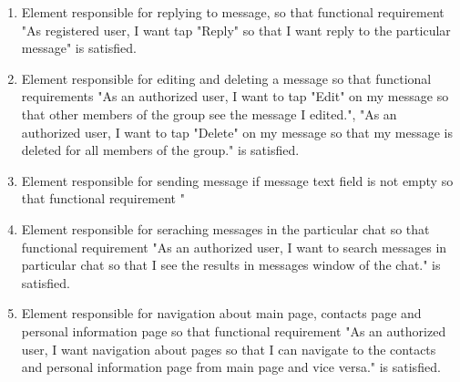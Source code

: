 \begin{enumerate}
    \item Element responsible for replying to message, so that functional requirement "As registered user,
    I want tap "Reply" so that I want reply to the particular message" is satisfied.
    \item Element responsible for editing and deleting a message so that functional requirements "As an authorized user, I want to tap
    "Edit" on my message so that other members of the group see the message I edited.", "As an authorized user, I want to tap "Delete"
    on my message so that my message is deleted for all members of the group." is satisfied.
    \item Element responsible for sending message if message text field is not empty so that functional requirement "
    \item Element responsible for seraching messages in the particular chat so that functional requirement "As an authorized user, I want to search messages
    in particular chat so that I see the results in messages window of the chat." is satisfied.
    \item Element responsible for navigation about main page, contacts page and personal information page so that functional requirement
    "As an authorized user, I want navigation about pages so that I can navigate to the contacts and personal information page from main page and vice versa."
    is satisfied.
\end{enumerate}

